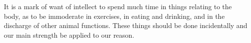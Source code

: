 It is a mark of want of intellect to spend much time in things relating
to the body, as to be immoderate in exercises, in eating and drinking,
and in the discharge of other animal functions. These things should be
done incidentally and our main strength be applied to our reason.
